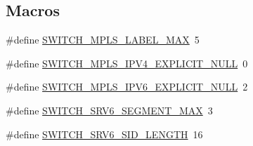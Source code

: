 \subsection*{Macros}
\begin{DoxyCompactItemize}
\item 
\#define \hyperlink{group__Tunnel_ga358d11e6167bb874159a7b6ac253221b}{S\+W\+I\+T\+C\+H\+\_\+\+M\+P\+L\+S\+\_\+\+L\+A\+B\+E\+L\+\_\+\+M\+A\+X}~5
\item 
\#define \hyperlink{group__Tunnel_ga4445b89170c80300ca9bc62249605ec4}{S\+W\+I\+T\+C\+H\+\_\+\+M\+P\+L\+S\+\_\+\+I\+P\+V4\+\_\+\+E\+X\+P\+L\+I\+C\+I\+T\+\_\+\+N\+U\+L\+L}~0
\item 
\#define \hyperlink{group__Tunnel_gad1efd6059d9f7fbd49f3ca77b5cca89d}{S\+W\+I\+T\+C\+H\+\_\+\+M\+P\+L\+S\+\_\+\+I\+P\+V6\+\_\+\+E\+X\+P\+L\+I\+C\+I\+T\+\_\+\+N\+U\+L\+L}~2
\item 
\#define \hyperlink{group__Tunnel_ga7da56385741dd85fc62b0518245e0b06}{S\+W\+I\+T\+C\+H\+\_\+\+S\+R\+V6\+\_\+\+S\+E\+G\+M\+E\+N\+T\+\_\+\+M\+A\+X}~3
\item 
\#define \hyperlink{group__Tunnel_ga9d8eb6604f4c584e8bcd459e24868968}{S\+W\+I\+T\+C\+H\+\_\+\+S\+R\+V6\+\_\+\+S\+I\+D\+\_\+\+L\+E\+N\+G\+T\+H}~16
\end{DoxyCompactItemize}
